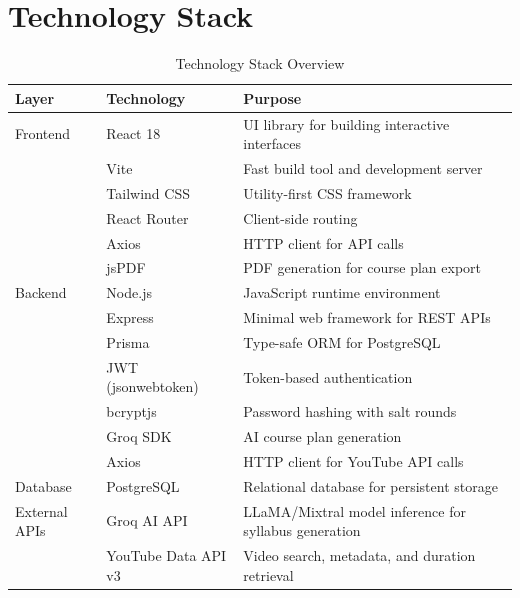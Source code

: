 \documentclass[12pt,a4paper]{report}
\begin{document}
\section{Technology Stack}

\begin{table}[H]
\centering
\caption{Technology Stack Overview}
\label{tab:techstack}
\begin{tabularx}{\textwidth}{l l X}
\toprule
\textbf{Layer} & \textbf{Technology} & \textbf{Purpose} \\
\midrule
Frontend       & React 18            & UI library for building interactive interfaces \\
               & Vite                & Fast build tool and development server \\
               & Tailwind CSS        & Utility-first CSS framework \\
               & React Router        & Client-side routing \\
               & Axios               & HTTP client for API calls \\
               & jsPDF               & PDF generation for course plan export \\
\midrule
Backend        & Node.js             & JavaScript runtime environment \\
               & Express             & Minimal web framework for REST APIs \\
               & Prisma              & Type-safe ORM for PostgreSQL \\
               & JWT (jsonwebtoken)  & Token-based authentication \\
               & bcryptjs            & Password hashing with salt rounds \\
               & Groq SDK            & AI course plan generation \\
               & Axios               & HTTP client for YouTube API calls \\
\midrule
Database       & PostgreSQL          & Relational database for persistent storage \\
\midrule
External APIs  & Groq AI API         & LLaMA/Mixtral model inference for syllabus generation \\
               & YouTube Data API v3 & Video search, metadata, and duration retrieval \\
\bottomrule
\end{tabularx}
\end{table}
\end{document}
